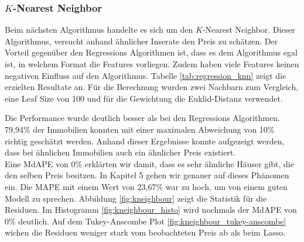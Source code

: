 \subsubsection{$K$-Nearest Neighbor}
\label{chapter:KNN}
Beim nächsten Algorithmus handelte es sich um den $K$-Nearest Neighbor. Dieser Algorithmus, versucht anhand ähnlicher Inserate den Preis zu schätzen. Der Vorteil gegenüber den Regressions Algorithmen ist, dass es dem Algorithmus egal ist, in welchem Format die Features vorliegen. Zudem haben viele Features keinen negativen Einfluss auf den Algorithmus.
Tabelle \ref{tab:regression_knn} zeigt die erzielten Resultate an. Für die Berechnung wurden zwei Nachbarn zum Vergleich, eine Leaf Size von 100 und für die Gewichtung die Euklid-Distanz verwendet.

\begin{table}[ht]
\centering
{}
\caption{Ergebnisse von $K$-Nearest Neighbor}
\label{tab:regression_knn}
\end{table}

Die Performance wurde deutlich besser als bei den Regressions Algorithmen. 79,94\% der Immobilien konnten mit einer maximalen Abweichung von 10\% richtig geschätzt werden. Anhand dieser Ergebnisse konnte aufgezeigt werden, dass bei ähnlichen Immobilien auch ein ähnlicher Preis existiert.\\
Eine MdAPE von 0\% erklärten wir damit, dass es sehr ähnliche Häuser gibt, die den selben Preis besitzen. In Kapitel 5 gehen wir genauer auf dieses Phänomen ein. Die MAPE mit einem Wert von 23,67\% war zu hoch, um von einem guten Modell zu sprechen. Abbildung \ref{fig:kneighbour} zeigt die Statistik für die Residuen. Im Histogramm \ref{fig:kneighbour_histo} wird nochmals der MdAPE von 0\% deutlich. Auf dem Tukey-Anscombe Plot \ref{fig:kneighbour_tukey-anscombe} wichen die Residuen weniger stark vom beobachteten Preis ab als beim Lasso.

